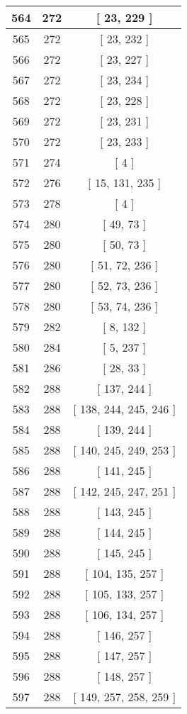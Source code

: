 \begin{center}
\begin{longtable}[H]{|| c c c ||}
564 & 272 & [ 23, 229 ] \\ 
\hline
565 & 272 & [ 23, 232 ] \\ 
\hline
566 & 272 & [ 23, 227 ] \\ 
\hline
567 & 272 & [ 23, 234 ] \\ 
\hline
568 & 272 & [ 23, 228 ] \\ 
\hline
569 & 272 & [ 23, 231 ] \\ 
\hline
570 & 272 & [ 23, 233 ] \\ 
\hline
571 & 274 & [ 4 ] \\ 
\hline
572 & 276 & [ 15, 131, 235 ] \\ 
\hline
573 & 278 & [ 4 ] \\ 
\hline
574 & 280 & [ 49, 73 ] \\ 
\hline
575 & 280 & [ 50, 73 ] \\ 
\hline
576 & 280 & [ 51, 72, 236 ] \\ 
\hline
577 & 280 & [ 52, 73, 236 ] \\ 
\hline
578 & 280 & [ 53, 74, 236 ] \\ 
\hline
579 & 282 & [ 8, 132 ] \\ 
\hline
580 & 284 & [ 5, 237 ] \\ 
\hline
581 & 286 & [ 28, 33 ] \\ 
\hline
582 & 288 & [ 137, 244 ] \\ 
\hline
583 & 288 & [ 138, 244, 245, 246 ] \\ 
\hline
584 & 288 & [ 139, 244 ] \\ 
\hline
585 & 288 & [ 140, 245, 249, 253 ] \\ 
\hline
586 & 288 & [ 141, 245 ] \\ 
\hline
587 & 288 & [ 142, 245, 247, 251 ] \\ 
\hline
588 & 288 & [ 143, 245 ] \\ 
\hline
589 & 288 & [ 144, 245 ] \\ 
\hline
590 & 288 & [ 145, 245 ] \\ 
\hline
591 & 288 & [ 104, 135, 257 ] \\ 
\hline
592 & 288 & [ 105, 133, 257 ] \\ 
\hline
593 & 288 & [ 106, 134, 257 ] \\ 
\hline
594 & 288 & [ 146, 257 ] \\ 
\hline
595 & 288 & [ 147, 257 ] \\ 
\hline
596 & 288 & [ 148, 257 ] \\ 
\hline
597 & 288 & [ 149, 257, 258, 259 ] \\ 

\end{longtable}
\end{center}
